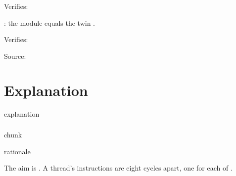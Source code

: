 \documentclass[letterpaper,10pt,english]{sphinxmanual}
\begin{document}
\begingroup{}\def\sphinxbelowcaptionspace{0pt}
\begin{sphinxVerbatim}[commandchars=\\\{\}]
\end{sphinxVerbatim}

\endgroup

\sphinxAtStartPar
Verifies: {\hyperref[\detokenize{core/core:core.rotation}]{}}

\begingroup{}\def\sphinxbelowcaptionspace{0pt}
\begin{sphinxVerbatim}[commandchars=\\\{\}]
\end{sphinxVerbatim}

\endgroup

\sphinxAtStartPar
{}: the module  equals the twin .

\sphinxAtStartPar
Verifies: {\hyperref[\detokenize{core/core:core.rotation}]{}}

\sphinxAtStartPar
Source: {\hyperref[\detokenize{core/core:source-3}]{}}


\section{Explanation}
\label{\detokenize{core/core:explanation-1}}
\begin{sphinxuseclass}{explanation}\label{\detokenize{core/core:why-1}}\subsubsection*{{\hyperref[\detokenize{core/core:rotation}]{}}}

\begin{sphinxuseclass}{chunk}
\begin{sphinxuseclass}{rationale}
\sphinxAtStartPar
{}

\sphinxAtStartPar
The aim is {\hyperref[\detokenize{core/core:core.aim}]{}}. A thread’s instructions are eight cycles apart, one for each of {\hyperref[\detokenize{core/core:core.threads}]{}}.

\end{sphinxuseclass}
\end{sphinxuseclass}
\end{sphinxuseclass}
\end{document}
